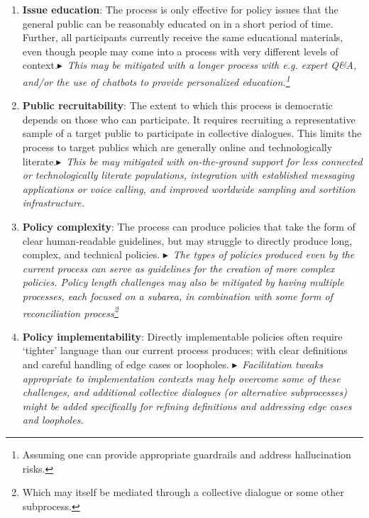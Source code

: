 \documentclass{article}
\begin{document}
\begin{enumerate}
\item 

\textbf{Issue education}: The process is only effective for policy issues that the general public can be reasonably educated on in a short period of time. Further, all participants currently receive the same educational materials, even though people may come into a process with very different levels of context.$\blacktriangleright$~\emph{This may be mitigated with a longer process with e.g. expert Q\&A, and/or the use of chatbots to provide personalized education.\footnote{Assuming one can provide appropriate guardrails and address hallucination risks.}}

\item 
\textbf{Public recruitability}: The extent to which this process is democratic depends on those who can participate. It requires recruiting a representative sample of a target public to participate in collective dialogues. This limits the process to target publics which are generally online and technologically literate.$\blacktriangleright$~\emph{This be may mitigated with on-the-ground support for less connected or technologically literate populations, integration with established messaging applications or voice calling, and improved worldwide sampling and sortition infrastructure.}

\item 
\textbf{Policy complexity}: The process can produce policies that take the form of clear human-readable guidelines, but may struggle to directly produce long, complex, and technical policies.
$\blacktriangleright$~\emph{The types of policies produced even by the current process can serve as guidelines for the creation of more complex policies. Policy length challenges may also be mitigated by having multiple processes, each focused on a subarea, in combination with some form of reconciliation process\footnote{Which may itself be mediated through a collective dialogue or some other subprocess.}}

\item 
\textbf{Policy implementability}: Directly implementable policies often require `tighter' language than our current process produces; with clear definitions and careful handling of edge cases or loopholes.
$\blacktriangleright$~\emph{Facilitation tweaks appropriate to implementation contexts may help overcome some of these challenges, and additional collective dialogues (or alternative subprocesses) might be added specifically for refining definitions and addressing edge cases and loopholes.}


\end{enumerate}
\end{document}
